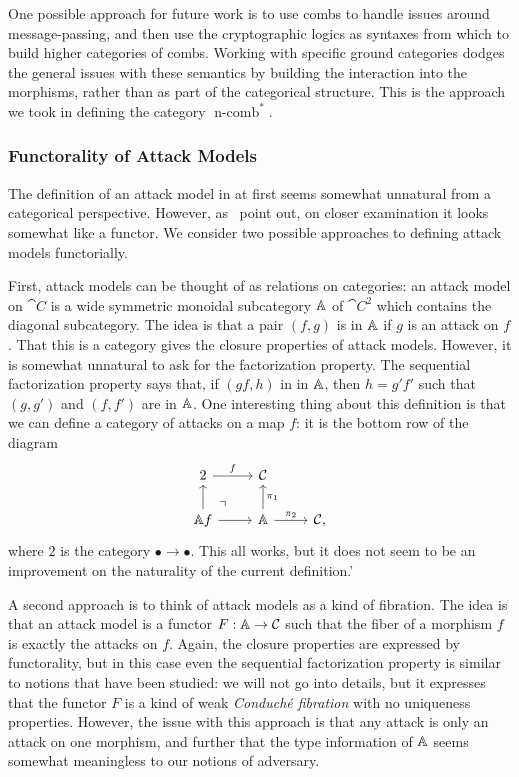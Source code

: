 One possible approach for future work is to use combs to handle issues around
message-passing, and then use the cryptographic logics as syntaxes from which to
build higher categories of combs. Working with specific ground categories dodges
the general issues with these semantics by building the interaction into the
morphisms, rather than as part of the categorical structure. This is the
approach we took in defining the category $\operatorname*{n-comb}^*$.

\subsubsection{Functorality of Attack Models}

The definition of an attack model in 
at first seems somewhat unnatural from a categorical perspective. However,
as~\cite{broadbent-karvonen-2022} point out, on closer examination it looks
somewhat like a functor. We consider two possible approaches to defining attack
models functorially.

First, attack models can be thought of as relations on categories: an attack
model on $\cat{C}$ is a wide symmetric monoidal subcategory $\AA$ of $\cat{C}^2$ which contains the
diagonal subcategory. The idea is that a pair $(f, g)$ is in $\AA$ if $g$ is an
attack on $f$. That this is a category gives the closure properties of attack
models. However, it is somewhat unnatural to ask for the factorization property.
The sequential factorization property says that, if $(gf, h)$ in in $\AA$, then
$h = g'f'$ such that $(g, g')$ and $(f, f')$ are in $\AA$. One interesting thing
about this definition is that we can define a category of attacks on a map $f$:
it is the bottom row of the diagram \[
  \begin{tikzcd}
    2\ar[r, "f"] & \cat{C} \\
    \AA f\ar[u]\ar[r]\ar[ur, phantom, "\urcorner", very near start] & \AA\ar[u,
    "\pi_1"']\ar[r, "\pi_2"] & \cat{C},
  \end{tikzcd}
\]where $2$ is the category $\bullet\to\bullet$. This all works, but
it does not seem to be an improvement on the naturality of the current
definition.'

A second approach is to think of attack models as a kind of fibration. The idea
is that an attack model is a functor $F: \AA\to\cat{C}$ such that the fiber of a
morphism $f$ is exactly the attacks on $f$. Again, the closure properties are
expressed by functorality, but in this case even the sequential factorization
property is similar to notions that have been studied: we will not go into
details, but it expresses that the functor $F$ is a kind of weak \emph{Conduché
fibration} with no uniqueness properties. However, the issue with this approach
is that any attack is only an attack on one morphism, and further that the type
information of $\AA$ seems somewhat meaningless to our notions of adversary.

